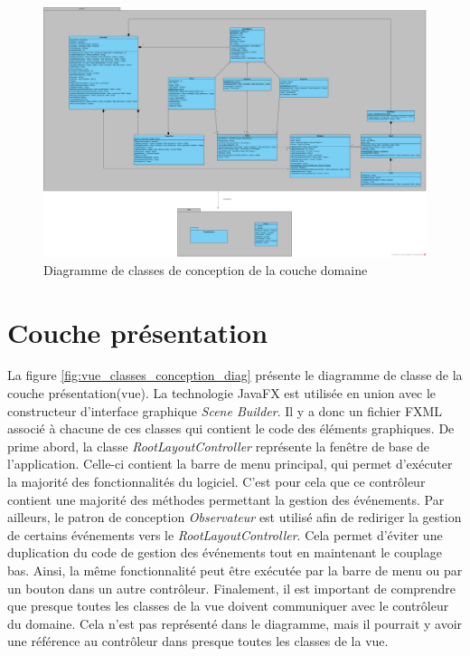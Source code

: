 \begin{figure}[htpb]
    \centering
    \includegraphics[scale=0.27]{fig/classe_conception_domain.png}
    \caption{Diagramme de classes de conception de la couche domaine}
    \label{fig:domaine_classe}
\end{figure}


\section{Couche présentation}
\label{sec:couche_presentation}

La figure \ref{fig:vue_classes_conception_diag} présente le diagramme de classe de la couche présentation(vue).
La technologie JavaFX est utilisée en union avec le constructeur d'interface graphique \textit{Scene Builder}.
Il y a donc un fichier FXML associé à chacune de ces classes qui contient le code des éléments graphiques.
De prime abord, la classe \textit{RootLayoutController} représente la fenêtre de base de l'application.
Celle-ci contient la barre de menu principal, qui permet d'exécuter la majorité des fonctionnalités du logiciel.
C'est pour cela que ce contrôleur contient une majorité des méthodes permettant la gestion des événements.
Par ailleurs, le patron de conception \textit{Observateur} est utilisé afin de rediriger la gestion de certains événements vers le \textit{RootLayoutController}.
Cela permet d'éviter une duplication du code de gestion des événements tout en maintenant le couplage bas.
Ainsi, la même fonctionnalité peut être exécutée par la barre de menu ou par un bouton dans un autre contrôleur.
Finalement, il est important de comprendre que presque toutes les classes de la vue doivent communiquer avec le contrôleur du domaine. 
Cela n'est pas représenté dans le diagramme, mais il pourrait y avoir une référence au contrôleur dans presque toutes les classes de la vue.


